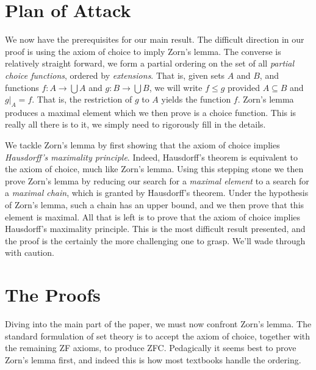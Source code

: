 \documentclass{article}
\theoremstyle{definition}
\begin{document}
    \section{Plan of Attack}
        We now have the prerequisites for our main result.
        The difficult direction in our proof is using the axiom of choice to
        imply Zorn's lemma. The converse is relatively straight forward, we
        form a partial ordering on the set of all
        \textit{partial choice functions}, ordered by \textit{extensions}.
        That is, given sets $A$ and $B$, and functions
        $f:A\rightarrow\bigcup{A}$ and $g:B\rightarrow\bigcup{B}$, we will
        write $f\leq{g}$ provided $A\subseteq{B}$ and
        $g|_{A}=f$. That is, the restriction of $g$ to $A$ yields the function
        $f$. Zorn's lemma produces a maximal element which we then prove is
        a choice function. This is really all there is to it, we simply need to
        rigorously fill in the details.
        \par\hfill\par
        We tackle Zorn's lemma by first showing that the axiom of choice
        implies \textit{Hausdorff's maximality principle}. Indeed, Hausdorff's
        theorem is equivalent to the axiom of choice, much like Zorn's lemma.
        Using this stepping stone we then prove Zorn's lemma by
        reducing our search for a \textit{maximal element} to a search for a
        \textit{maximal chain}, which is granted by Hausdorff's theorem.
        Under the hypothesis of Zorn's lemma, such a chain has an upper bound,
        and we then prove that this element is maximal. All that is left is to
        prove that the axiom of choice implies Hausdorff's maximality principle.
        This is the most difficult result presented, and the proof is the
        certainly the more challenging one to grasp. We'll wade through
        with caution.
    \section{The Proofs}
        Diving into the main part of the paper, we must now confront
        Zorn's lemma. The standard formulation of set theory is to accept the
        axiom of choice, together with the remaining ZF axioms, to produce
        ZFC. Pedagically it seems best to prove Zorn's lemma first, and indeed
        this is how most textbooks handle the ordering.
\end{document}
